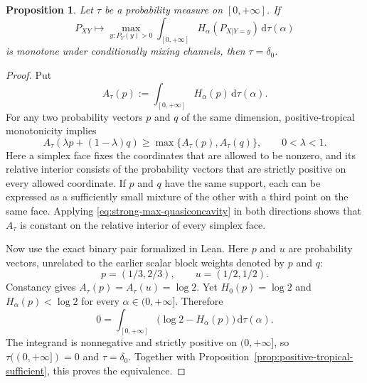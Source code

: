 \documentclass[aps,pra,11pt,onecolumn,nofootinbib,tightenlines]{revtex4-2}
\newtheorem{proposition}[theorem]{Proposition}
\theoremstyle{definition}
\begin{document}
\begin{proposition}
\label{prop:positive-tropical-necessary}
Let $\tau$ be a probability measure on $[0,+\infty]$.  If
\begin{equation}
 P_{XY}\longmapsto
 \max_{y:P_Y(y)>0}\int_{[0,+\infty]}
 H_\alpha(P_{X|Y=y})\,\mathrm d\tau(\alpha)
 \label{eq:positive-tropical-general-candidate}
\end{equation}
is monotone under conditionally mixing channels, then $\tau=\delta_0$.
\end{proposition}

\begin{proof}
Put
\begin{equation}
 A_\tau(p):=\int_{[0,+\infty]}H_\alpha(p)\,\mathrm d\tau(\alpha).
 \label{eq:positive-tropical-integrated-entropy}
\end{equation}
For any two probability vectors $p$ and $q$ of the same dimension,
positive-tropical monotonicity implies
\begin{equation}
 A_\tau(\lambda p+(1-\lambda)q)
 \geq\max\{A_\tau(p),A_\tau(q)\},
 \qquad 0<\lambda<1.
 \label{eq:strong-max-quasiconcavity}
\end{equation}
Here a simplex face fixes the coordinates that are allowed to be nonzero, and
its relative interior consists of the probability vectors that are strictly
positive on every allowed coordinate.  If $p$ and $q$ have the same support,
each can be expressed as a sufficiently small mixture of the other with a
third point on the same face.  Applying
\eqref{eq:strong-max-quasiconcavity} in both directions shows that $A_\tau$ is
constant on the relative interior of every simplex face.

Now use the exact binary pair formalized in Lean.  Here $p$ and $u$ are
probability vectors, unrelated to the earlier scalar block weights denoted by
$p$ and $q$:
\begin{equation}
 p=(1/3,2/3),
 \qquad
 u=(1/2,1/2).
 \label{eq:positive-tropical-binary-points}
\end{equation}
Constancy gives $A_\tau(p)=A_\tau(u)=\log2$.  Yet $H_0(p)=\log2$ and
$H_\alpha(p)<\log2$ for every $\alpha\in(0,+\infty]$.  Therefore
\begin{equation}
 0=\int_{[0,+\infty]}
 \bigl(\log2-H_\alpha(p)\bigr)\,\mathrm d\tau(\alpha).
 \label{eq:positive-tropical-zero-gap}
\end{equation}
The integrand is nonnegative and strictly positive on $(0,+\infty]$, so
$\tau((0,+\infty])=0$ and $\tau=\delta_0$.  Together with
Proposition~\ref{prop:positive-tropical-sufficient}, this proves the equivalence.
\end{proof}
\end{document}
